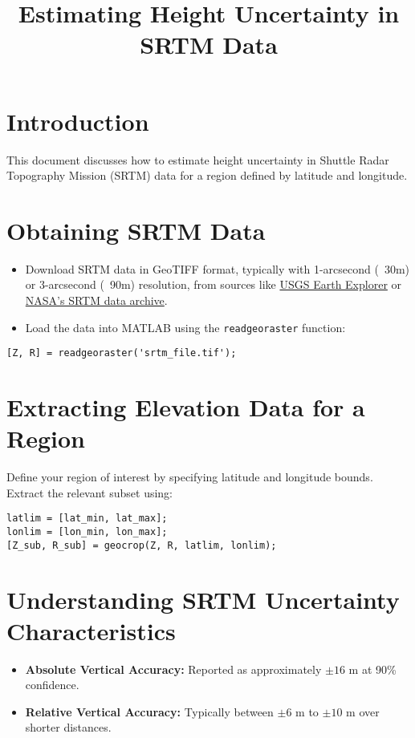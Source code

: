 \documentclass{article}
\title{\bf{Estimating Height Uncertainty in SRTM Data}}
\author{}
\date{}
\begin{document}
\maketitle

\section{Introduction}
This document discusses how to estimate height uncertainty in Shuttle Radar Topography Mission (SRTM) data for a region defined by latitude and longitude. 

\section{Obtaining SRTM Data}
\begin{itemize}
    \item Download SRTM data in GeoTIFF format, typically with 1-arcsecond (~30m) or 3-arcsecond (~90m) resolution, from sources like \href{https://earthexplorer.usgs.gov/}{USGS Earth Explorer} or \href{https://doi.org/10.5067/MEaSUREs/SRTM/SRTMGL1.003}{NASA’s SRTM data archive}.
    \item Load the data into MATLAB using the \texttt{readgeoraster} function:
\end{itemize}

\begin{verbatim}
[Z, R] = readgeoraster('srtm_file.tif');
\end{verbatim}

\section{Extracting Elevation Data for a Region}
Define your region of interest by specifying latitude and longitude bounds. Extract the relevant subset using:

\begin{verbatim}
latlim = [lat_min, lat_max];
lonlim = [lon_min, lon_max];
[Z_sub, R_sub] = geocrop(Z, R, latlim, lonlim);
\end{verbatim}

\section{Understanding SRTM Uncertainty Characteristics}
\begin{itemize}
    \item \textbf{Absolute Vertical Accuracy:} Reported as approximately $\pm 16$ m at 90\% confidence.
    \item \textbf{Relative Vertical Accuracy:} Typically between $\pm 6$ m to $\pm 10$ m over shorter distances.
\end{itemize}
\end{document}
